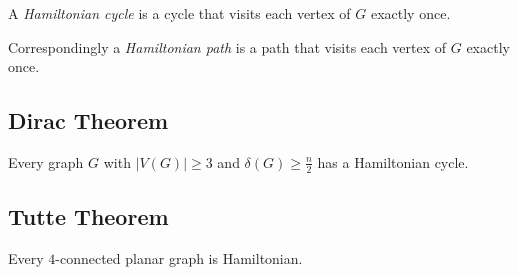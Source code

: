 A \emph{Hamiltonian cycle} is a cycle that visits each vertex of $G$ exactly once.

Correspondingly a \emph{Hamiltonian path} is a path that visits each vertex of $G$ exactly once.

\subsection*{Dirac Theorem}

Every graph $G$ with $|V(G)| \geq 3$ and $\delta(G) \geq \frac{n}{2}$ has a Hamiltonian cycle.

\subsection*{Tutte Theorem}

Every $4$-connected planar graph is Hamiltonian.
